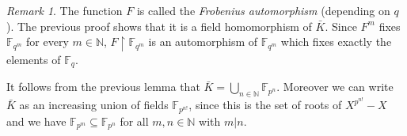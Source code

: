 \documentclass[10pt]{amsart}
\newcommand{\FF}{\mathbb{F}}
\newcommand{\NNN}{\mathbb{N}}
\newtheorem{lemma}[theorem]{Lemma}
\theoremstyle{definition}
\theoremstyle{remark}
\newtheorem{remark}[theorem]{Remark}
\begin{document}
\begin{remark} 
The function $F$ is called the \emph{Frobenius automorphism} (depending on $q$). The previous proof shows that it is a field  homomorphism of $\bar{K}$. Since $F^m$ fixes $\FF_{q^m}$ for every $m\in\NNN$, $F{\upharpoonright}\FF_{q^m}$ is an automorphism of $\FF_{q^m}$ which fixes exactly the elements of $\FF_q$. 
\end{remark} 

It follows from the previous lemma that $\bar{K}=\bigcup_{n\in\NNN} \FF_{p^n}$. Moreover we can write $\bar{K}$ as an increasing union of fields $\FF_{p^{n!}}$, since this is the set of roots of $X^{p^{n!}}-X$ and we have $\FF_{p^m}\subseteq \FF_{p^n}$ for all $m,n\in\NNN$ with $m|n$. 

%
%
%
\end{document}
